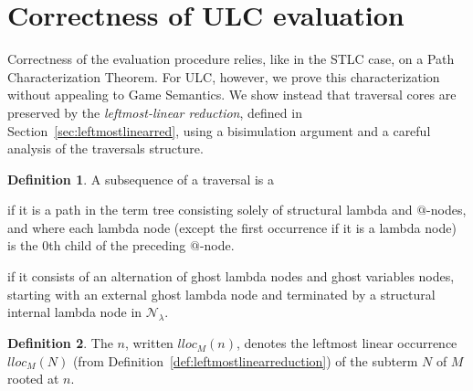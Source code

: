 \documentclass{elsarticle}
\makeatletter
\theoremstyle{plain}
\theoremstyle{definition}
\newtheorem{definition}{Definition}[section]
\newcommand\Nodes{\mathcal{N}}%
\newcommand\NodesLmd{\Nodes_\lambda}%
\renewcommand\ie{{\it i.e.\@\xspace}}
\makeatother
\begin{document}
\section{Correctness of ULC evaluation}
\label{sec:correctness_ulc_normalization}
Correctness of the evaluation procedure relies, like in the STLC case, on a Path Characterization Theorem.
For ULC, however, we prove this characterization without appealing to Game Semantics.
We show instead that traversal cores are preserved by the \emph{leftmost-linear reduction}, defined in Section~\ref{sec:leftmostlinearred}, using a bisimulation argument and a careful analysis of the traversals structure.

\begin{definition}
    \label{def:spinaldescent_pendingarglookup}
A subsequence of a traversal is a
\begin{enumerate*}[nosep,label=(\roman*)]
\item {} if it is a path in the term tree consisting solely of structural lambda and $@$-nodes, and where each lambda node (except the first occurrence if it is a lambda node) is the $0$th child of the preceding $@$-node.
\item {} if it consists of an alternation of ghost lambda nodes and ghost variables nodes, starting with an external ghost lambda node and terminated by a structural internal lambda node in $\NodesLmd$.
\end{enumerate*}
\end{definition}

\begin{definition}
The  $n$, written
 $lloc_M(n)$, denotes the leftmost linear occurrence $lloc_M(N)$ (from Definition~\ref{def:leftmostlinearreduction}) of the subterm $N$ of $M$ rooted at $n$.
\end{definition}
\end{document}
